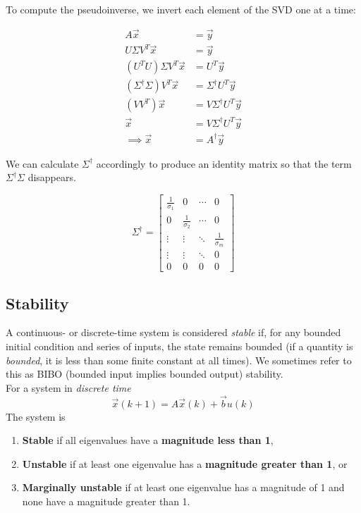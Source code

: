 To compute the pseudoinverse, we invert each element of the SVD one at a time:

\begin{align*}
    A \vec{x} &= \vec{y} \\
    U \Sigma V^T \vec{x} &= \vec{y} \\
    (U^T U) \Sigma V^T \vec{x} &= U^T \vec{y} \\
    (\Sigma^{\dagger} \Sigma) V^T \vec{x} &= \Sigma^{\dagger} U^T \vec{y} \\
    (V V^T) \vec{x} &= V \Sigma^{\dagger} U^T \vec{y} \\
    \vec{x} &= V \Sigma^{\dagger} U^T \vec{y} \\
    \implies \vec{x} &= A^{\dagger} \vec{y}
\end{align*}

We can calculate $\Sigma^{\dagger}$ accordingly to produce an identity matrix so that the term $\Sigma^{\dagger}\Sigma$ disappears.

$$\Sigma^{\dagger} = \begin{bmatrix} \frac{1}{\sigma_{1}} & 0 &  \cdots & 0 \\ 0 & \frac{1}{\sigma_{2}} & \cdots & 0 \\ \vdots & \vdots & \ddots & \frac{1}{\sigma_{m}} \\ 
    \vdots & \vdots & \ddots & 0 \\ 0 & 0 & 0 & 0 \end{bmatrix}$$

\subsection*{Stability}
A continuous- or discrete-time system is considered \textit{stable} if, for any bounded initial condition and series of inputs, the state remains bounded (if a quantity is \textit{bounded}, it is less than some finite constant at all times). We sometimes refer to this as BIBO (bounded input implies bounded output) stability. \\
\newline
For a system in \textit{discrete time}
$$\vec{x}(k + 1) = A\vec{x}(k) + \vec{b}u(k)$$
The system is
\begin{enumerate}
    \item \textbf{Stable} if all eigenvalues have a \textbf{magnitude less than 1},
    \item \textbf{Unstable} if at least one eigenvalue has a \textbf{magnitude greater than 1}, or
    \item \textbf{Marginally unstable} if at least one eigenvalue has a magnitude of 1 and none have a magnitude greater than 1.
\end{enumerate}

